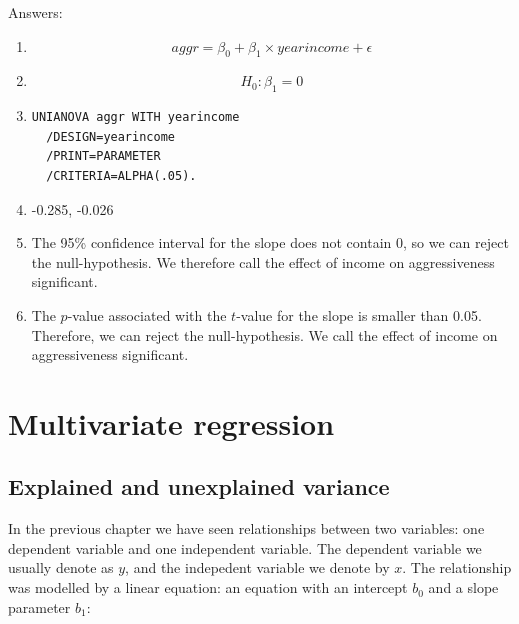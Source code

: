 \documentclass[]{report}\usepackage[]{graphicx}\usepackage[]{color}
\begin{document}
Answers:

\begin{enumerate}
\item

\begin{equation}
aggr = \beta_0 + \beta_1 \times yearincome + \epsilon
\end{equation}

\item
\begin{equation}
H_0 : \beta_1 = 0
\end{equation}


\item
\begin{verbatim}
UNIANOVA aggr WITH yearincome
  /DESIGN=yearincome
  /PRINT=PARAMETER
  /CRITERIA=ALPHA(.05).
\end{verbatim}




\item

 -0.285, -0.026



\item The 95\% confidence interval for the slope does not contain 0, so we can reject the null-hypothesis. We therefore call the effect of income on aggressiveness significant.

\item The $p$-value associated with the $t$-value for the slope is smaller than 0.05. Therefore, we can reject the null-hypothesis. We  call the effect of income on aggressiveness significant.


\end{enumerate}










\chapter{Multivariate regression}


\section{Explained and unexplained variance}

In the previous chapter we have seen relationships between two variables: one dependent variable and one independent variable. The dependent variable we usually denote as $y$, and the indepedent variable we denote by $x$. The relationship was modelled by a linear equation: an equation with an intercept $b_0$ and a slope parameter $b_1$:
\end{document}
